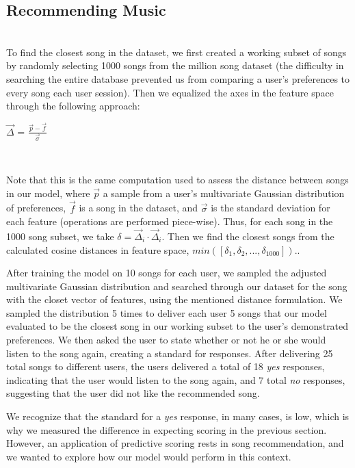 \documentclass{amsart}
\theoremstyle{plain}
\theoremstyle{definition}
\begin{document}
  	\subsection{Recommending Music} \ \\
  	
  	To find the closest song in the dataset, we first created a working subset of songs by randomly selecting 1000 songs from the million song dataset (the difficulty in searching the entire database prevented us from comparing a user's preferences to every song each user session). Then we equalized the axes in the feature space through the following approach: \\
  	
  	\begin{center}
  		$\vec{\Delta}$ = $\frac{\vec{p} - \vec{f}}{\vec{\sigma}}$
  	\end{center} \
  	
  	Note that this is the same computation used to assess the distance between songs in our model, where $\vec{p}$ a sample from a user's multivariate Gaussian distribution of preferences, $\vec{f}$ is a song in the dataset, and $\vec{\sigma}$ is the standard deviation for each feature (operations are performed piece-wise). Thus, for each song in the 1000 song subset, we take $\delta = \vec{\Delta}_{i} \cdot \vec{\Delta}_{i}$. Then we find the closest songs from the calculated cosine distances in feature space, $min([\delta_{1},\delta_{2}, ..., \delta_{1000}])$..
  	
  	After training the model on 10 songs for each user, we sampled the adjusted multivariate Gaussian distribution and searched through our dataset for the song with the closet vector of features, using the mentioned distance formulation. We sampled the distribution 5 times to deliver each user 5 songs that our model evaluated to be the closest song in our working subset to the user's demonstrated preferences. We then asked the user to state whether or not he or she would listen to the song again, creating a standard for responses. After delivering 25 total songs to different users, the users delivered a total of 18 \textit{yes} responses, indicating that the user would listen to the song again, and 7 total \textit{no} responses, suggesting that the user did not like the recommended song.
  	
  	We recognize that the standard for a \textit{yes} response, in many cases, is low, which is why we measured the difference in expecting scoring in the previous section. However, an application of predictive scoring rests in song recommendation, and we wanted to explore how our model would perform in this context.
  	
\end{document}
